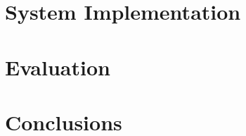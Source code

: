 \documentclass[sigconf, nonacm]{acmart}
\begin{document}
\section{System Implementation}
\label{sec:system-implementation}


\section{Evaluation}
\label{sec:evaluation}


\section{Conclusions}
\label{sec:conclusions}






\end{document}
